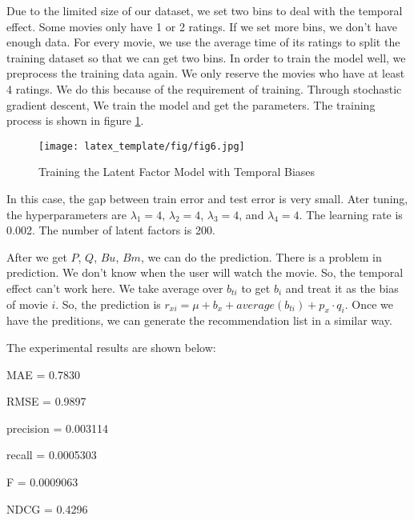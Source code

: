 \documentclass[sigconf]{acmart}
\begin{document}
\item{
Due to the limited size of our dataset, we set two bins to deal with the temporal effect. Some movies only have 1 or 2 ratings. If we set more bins, we don't have enough data. For every movie, we use the average time of its ratings to split the training dataset so that we can get two bins. In order to train the model well, we preprocess the training data again. We only reserve the movies who have at least 4 ratings. We do this because of the requirement of training.  
Through stochastic gradient descent, We train the model and get the parameters. The training process is shown in figure \ref{LFM3}.

\begin{figure}
    \centering
    \texttt{[image: latex\_template/fig/fig6.jpg]}
    \caption{Training the Latent Factor Model with Temporal Biases}
    \label{LFM3}
\end{figure}

In this case, the gap between train error and test error is very small. Ater tuning, the hyperparameters are $\lambda_1 = 4$, $\lambda_2 = 4$, $\lambda_3 = 4$, and $\lambda_4 = 4$. The learning rate is 0.002. The number of latent factors is 200.

After we get $P$, $Q$, $Bu$, $Bm$, we can do the prediction. There is a problem in prediction. We don't know when the user will watch the movie. So, the temporal effect can't work here. We take average over $b_{ti}$ to get $b_i$ and treat it as the bias of movie $i$. So, the prediction is $r_{xi} = \mu + b_x + average(b_{ti}) + p_x \cdot q_i$. Once we have the preditions, we can generate the recommendation list in a similar way.


}


\item{The experimental results are shown below:}
\item{MAE = 0.7830}
\item{RMSE = 0.9897}
\item{precision = 0.003114}
\item{recall = 0.0005303}
\item{F = 0.0009063}
\item{NDCG = 0.4296}
\end{document}
